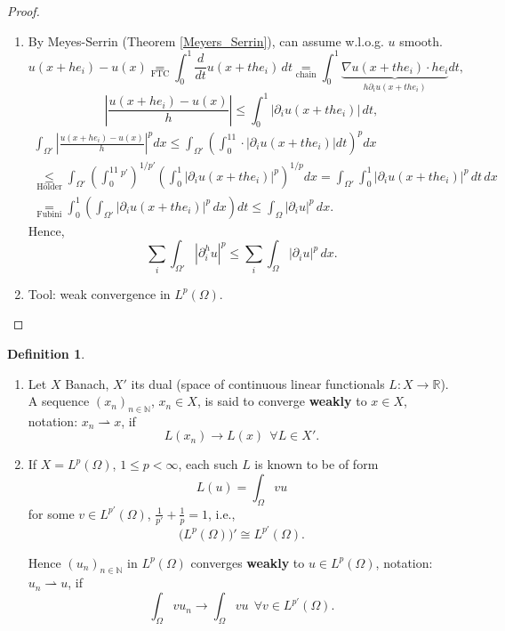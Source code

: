 \documentclass[12pt]{article}
\theoremstyle{definition}
\newtheorem{definition}{Definition}[section]
\begin{document}
\begin{proof}
\begin{enumerate}[label=(\roman*)]
\item By Meyes-Serrin (Theorem \ref{Meyers_Serrin}), can assume w.l.o.g. $u$ smooth.
\[u(x+he_i)-u(x)\underset{\text{FTC}}=\int_0^1\frac d{dt}u(x+the_i)\,dt\underset{\text{chain}}=\int_0^1\underbrace{\nabla u(x+the_i)\cdot he_i}_{h\partial_iu(x+the_i)}dt,\]
\[\left|\frac{u(x+he_i)-u(x)}h\right|\leq\int_0^1\big|\partial_iu(x+the_i)\big|\,dt,\]
\begin{multline*}
\int_{\Omega'}\left|\frac{u(x+he_i)-u(x)}h\right|^pdx\leq\int_{\Omega'}\left(\int_0^11\cdot\big|\partial_iu(x+the_i)\big|dt\right)^pdx\\
\underset{\text{H\"older}}\leq\int_{\Omega'}\left(\int_0^11^{p'}\right)^{1/p'}\left(\int_0^1\big|\partial_iu(x+the_i)\big|^p\right)^{1/p}dx=\int_{\Omega'}\int_0^1\big|\partial_iu(x+the_i)\big|^p\,dt\,dx\\
\underset{\text{Fubini}}=\int_0^1\left(\int_{\Omega'}\big|\partial_iu(x+the_i)\big|^p\,dx\right)dt\leq\int_\Omega|\partial_iu|^p\,dx.
\end{multline*}
Hence,
\[\sum_i\int_{\Omega'}|\partial_i^hu|^p\leq\sum_i\int_\Omega|\partial_iu|^p\,dx.\]

\item Tool: weak convergence in $L^p(\Omega)$.
\end{enumerate}
\end{proof}

\begin{definition}
\begin{enumerate}[label=\alph*)]
\item Let $X$ Banach, $X'$ its dual (space of continuous linear functionals $L:X\rightarrow\mathbb R$). A sequence $(x_n)_{n\in\mathbb N}$, $x_n\in X$, is said to converge \textbf{weakly} to $x\in X$, notation: $x_n\rightharpoonup x$, if
\[L(x_n)\longrightarrow L(x)\ \ \forall L\in X'.\]

\item If $X=L^p(\Omega)$, $1\leq p<\infty$, each such $L$ is known to be of form
\[L(u)=\int_\Omega vu\]
for some $v\in L^{p'}(\Omega)$, $\frac1{p'}+\frac1p=1$, i.e.,
\[\big(L^p(\Omega)\big)'\cong L^{p'}(\Omega).\]

Hence $(u_n)_{n\in\mathbb N}$ in $L^p(\Omega)$ converges \textbf{weakly} to $u\in L^p(\Omega)$, notation: $u_n\rightharpoonup u$, if
\[\int_\Omega vu_n\longrightarrow\int_\Omega vu\ \ \forall v\in L^{p'}(\Omega).\]
\end{enumerate}
\end{definition}
\end{document}
